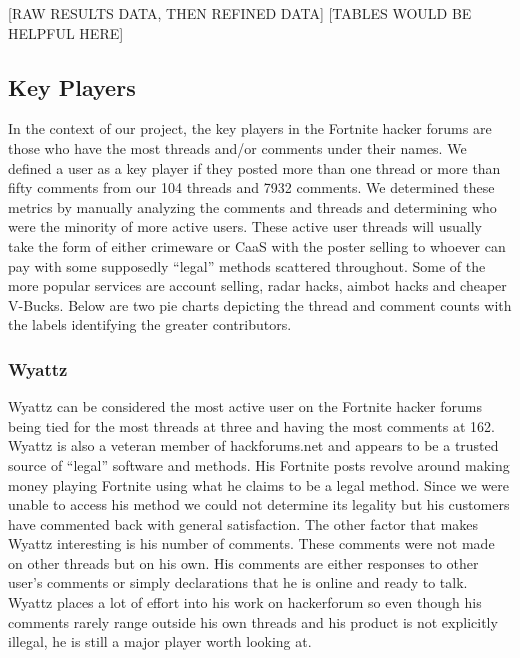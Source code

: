 \documentclass[sigconf]{acmart}
\begin{document}
[RAW RESULTS DATA, THEN REFINED DATA]
[TABLES WOULD BE HELPFUL HERE]

\subsection{Key Players}
In the context of our project, the key players in the Fortnite hacker forums are those who have the most threads and/or comments under their names. We defined a user as a key player if they posted more than one thread or more than fifty comments from our 104 threads and 7932 comments. We determined these metrics by manually analyzing the comments and threads and determining who were the minority of more active users. These active user threads will usually take the form of either crimeware or CaaS with the poster selling to whoever can pay with some supposedly “legal” methods scattered throughout. Some of the more popular services are account selling, radar hacks, aimbot hacks and cheaper V-Bucks. Below are two pie charts depicting the thread and comment counts with the labels identifying the greater contributors.




\subsubsection{Wyattz}
Wyattz can be considered the most active user on the Fortnite hacker forums being tied for the most threads at three and having the most comments at 162. Wyattz is also a veteran member of hackforums.net and appears to be a trusted source of “legal” software and methods. His Fortnite posts revolve around making money playing Fortnite using what he claims to be a legal method. Since we were unable to access his method we could not determine its legality but his customers have commented back with general satisfaction. The other factor that makes Wyattz interesting is his number of comments. These comments were not made on other threads but on his own. His comments are either responses to other user’s comments or simply declarations that he is online and ready to talk. Wyattz places a lot of effort into his work on hackerforum so even though his comments rarely range outside his own threads and his product is not explicitly illegal, he is still a major player worth looking at.
\end{document}
